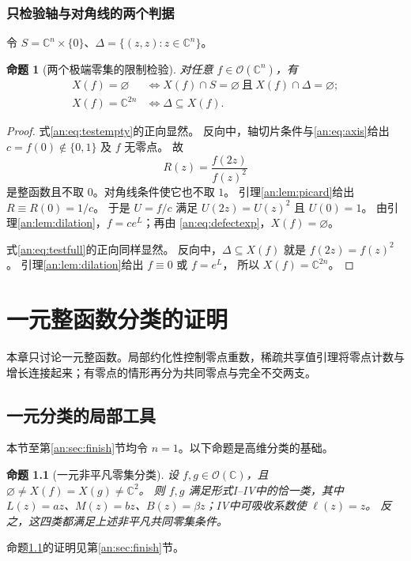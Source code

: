 \documentclass[11pt,a4paper,oneside,openany]{book}
\theoremstyle{lecture}
\newtheorem{proposition}[theorem]{命题}
\newcommand{\C}{\mathbb C}
\newcommand{\OO}{\mathcal O}
\newcommand{\e}{e}
\numberwithin{equation}{section}
\begin{document}
\subsection{只检验轴与对角线的两个判据}
令 $S=\C^n\times\{0\}$、$\Delta=\{(z,z):z\in\C^n\}$。
\begin{proposition}[两个极端零集的限制检验]\label{an:prop:tests}
对任意 $f\in\OO(\C^n)$，有
\begin{align}
 X(f)=\varnothing
 &\Longleftrightarrow
 X(f)\cap S=\varnothing\ \text{且}\ X(f)\cap\Delta=\varnothing;
 \label{an:eq:testempty}\\
 X(f)=\C^{2n}
 &\Longleftrightarrow \Delta\subseteq X(f).
 \label{an:eq:testfull}
\end{align}
\end{proposition}
\begin{proof}
式\eqref{an:eq:testempty}的正向显然。
反向中，轴切片条件与\eqref{an:eq:axis}给出
$c=f(0)\notin\{0,1\}$ 及 $f$ 无零点。
故
\[
 R(z)=\frac{f(2z)}{f(z)^2}
\]
是整函数且不取 $0$。对角线条件使它也不取 $1$。
引理\ref{an:lem:picard}给出 $R\equiv R(0)=1/c$。
于是 $U=f/c$ 满足 $U(2z)=U(z)^2$ 且 $U(0)=1$。
由引理\ref{an:lem:dilation}，$f=c\e^L$；再由
\eqref{an:eq:defectexp}，$X(f)=\varnothing$。

式\eqref{an:eq:testfull}的正向同样显然。
反向中，$\Delta\subseteq X(f)$ 就是 $f(2z)=f(z)^2$。
引理\ref{an:lem:dilation}给出 $f\equiv0$ 或 $f=\e^L$，
所以 $X(f)=\C^{2n}$。
\end{proof}


\chapter{一元整函数分类的证明}\label{ch:onevar}
本章只讨论一元整函数。局部约化性控制零点重数，稀疏共享值引理将零点计数与增长连接起来；有零点的情形再分为共同零点与完全不交两支。
\section{一元分类的局部工具}\label{an:sec:onevar-local}
本节至第\ref{an:sec:finish}节均令 $n=1$。以下命题是高维分类的基础。
\begin{proposition}[一元非平凡零集分类]\label{an:thm:onevar}
设 $f,g\in\OO(\C)$，且 $\varnothing\ne X(f)=X(g)\ne\C^2$。
则 $f,g$ 满足形式I--IV中的恰一类，其中
$L(z)=az$、$M(z)=bz$、$B(z)=\beta z$；IV中可吸收系数使 $\ell(z)=z$。
反之，这四类都满足上述非平凡共同零集条件。
\end{proposition}
命题\ref{an:thm:onevar}的证明见第\ref{an:sec:finish}节。
\end{document}
